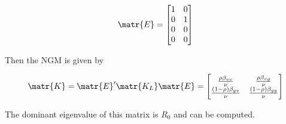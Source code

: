 \documentclass[11pt]{article}
\begin{document}
\[ \matr{E} = \begin{bmatrix} 1 & 0 \\ 0 & 1 \\ 0 & 0 \\ 0 & 0 \end{bmatrix} \]

Then the NGM is given by

\[
	\matr{K} = \matr{E}^\prime \matr{K_L} \matr{E} = 
\begin{bmatrix}
	\frac{\rho  \beta_{vv}}{\nu } & \frac{\rho  \beta_{vg}}{\nu } \\
	\frac{(1-\rho ) \beta_{gv}}{\nu } & \frac{(1-\rho ) \beta_{gg}}{\nu }
\end{bmatrix}
\]

The dominant eigenvalue of this matrix is \(  R_0 \)  and can be computed.
\end{document}
